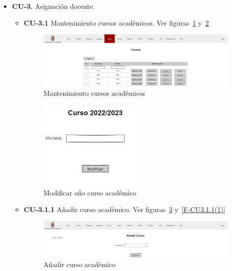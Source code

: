 \begin{itemize}
\newpage
	\item \textbf{CU-3.} Asignación docente.
	\begin{itemize}
		\item \textbf{CU-3.1} Mantenimiento cursos académicos. Ver figuras~\ref{F-CU3.1} y~\ref{F-CU3.1(1)}
		\begin{figure}[!h]
		\centering
		\includegraphics[width=\textwidth]{../img/Anexos/Vistas/cursos.png}
		\caption{Mantenimiento cursos académicos}\label{F-CU3.1}
		\end{figure}
		\FloatBarrier
		\begin{figure}[!h]
		\centering
		\includegraphics[width=0.5\textwidth]{../img/Anexos/Vistas/mod_ano_curso.png}
		\caption{Modificar año curso académico}\label{F-CU3.1(1)}
		\end{figure}
		\FloatBarrier
\newpage
		\item \textbf{CU-3.1.1} Añadir curso académico. Ver figuras~\ref{F-CU3.1.1} y~\ref{F-CU3.1.1(1)}
		\begin{figure}[!h]
		\centering
		\includegraphics[width=\textwidth]{../img/Anexos/Vistas/add_curso.png}
		\caption{Añadir curso académico}\label{F-CU3.1.1}
		\end{figure}
		\FloatBarrier
		\begin{figure}[!h]

\end{figure}
\end{itemize}
\end{itemize}
